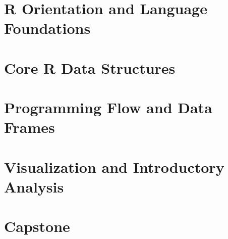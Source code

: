 \documentclass[11pt,oneside,a4paper]{report}
\begin{document}
\hypersetup{pageanchor=false}



\cleardoublepage
{}
\setcounter{tocdepth}{0}
\begingroup
\small
\setlength{\parskip}{0pt}
\tableofcontents
\endgroup
\newpage
\hypersetup{pageanchor=true}



\cleardoublepage
{}

\part{R Orientation and Language Foundations}





\part{Core R Data Structures}





\part{Programming Flow and Data Frames}







\part{Visualization and Introductory Analysis}





\part{Capstone}

\end{document}

